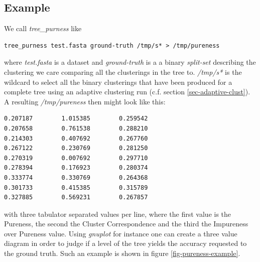 \subsection{Example}
We call \emph{tree\_purness} like
\begin{lstlisting}
tree_purness test.fasta ground-truth /tmp/s* > /tmp/pureness
\end{lstlisting}
where \emph{test.fasta} is a dataset and \emph{ground-truth} is a
a binary \emph{split-set} describing the clustering we care comparing
all the clusterings in the tree to. \emph{/tmp/s*} is the wildcard to
select all the binary clusterings that have been produced for a
complete tree using an adaptive clustering run (c.f. section
\ref{sec-adaptive-clust}).
A resulting \emph{/tmp/pureness} then might look like this:
\begin{lstlisting}
0.207187        1.015385        0.259542
0.207658        0.761538        0.288210
0.214303        0.407692        0.267760
0.267122        0.230769        0.281250
0.270319        0.007692        0.297710
0.278394        0.176923        0.280374
0.333774        0.330769        0.264368
0.301733        0.415385        0.315789
0.327885        0.569231        0.267857
\end{lstlisting}
with three tabulator separated values per line, where the first value
is the Pureness, the second the Cluster Correspondence and the third
the Impureness over Pureness value. Using \emph{gnuplot} for instance
one can create a three value diagram in order to judge if a level of
the tree yields the accuracy requested to the ground truth. Such an
example is shown in figure \ref{fig-pureness-example}.
